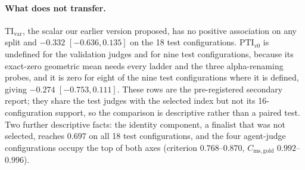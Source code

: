 \paragraph{What does not transfer.}
$\mathrm{TI}_{\mathrm{var}}$, the scalar our earlier version proposed, has no positive association on any split and $-0.332$ $[-0.636, 0.135]$ on the 18 test configurations.
$\mathrm{PTI}_{v0}$ is undefined for the validation judges and for nine test configurations, because its exact-zero geometric mean needs every ladder and the three alpha-renaming probes, and it is zero for eight of the nine test configurations where it is defined, giving $-0.274$ $[-0.753, 0.111]$.
These rows are the pre-registered secondary report; they share the test judges with the selected index but not its 16-configuration support, so the comparison is descriptive rather than a paired test.
Two further descriptive facts: the identity component, a finalist that was not selected, reaches $0.697$ on all 18 test configurations, and the four agent-judge configurations occupy the top of both axes (criterion $0.768$--$0.870$, $C_{\mathrm{ms,gold}}$ $0.992$--$0.996$).

